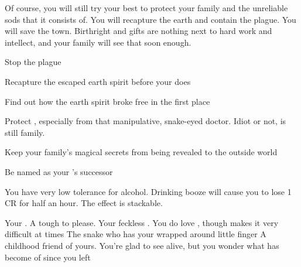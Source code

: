 \documentclass[char]{Pestilence}
\begin{document}
Of course, you will still try your best to protect your family and the unreliable sods that it consists of. You will recapture the earth and contain the plague. You will save the town. Birthright and gifts are nothing next to hard work and intellect, and your family will see that soon enough.

\begin{itemz}[Goals]
	\item Stop the plague
	\item Recapture the escaped earth spirit before your \cElder{\parent} does
	\item Find out how the earth spirit broke free in the first place
	\item Protect \cRebel{}, especially from that manipulative, snake-eyed doctor. Idiot or not, \cRebel{} is still family.
	\item Keep your family's magical secrets from being revealed to the outside world
	\item Be named as your \cElder{\parent}'s successor
\end{itemz}

\begin{itemz}[Notes]
	\item You have very low tolerance for alcohol. Drinking booze will cause you to lose 1 CR for half an hour. The effect is stackable.
\end{itemz}

\begin{contacts}
	\contact{\cElder{}} Your \cElder{\parent}. A tough \cElder{\human} to please.
	\contact{\cRebel{}} Your feckless \cRebel{\sibling}. You do love \cRebel{\them}, though \cRebel{\they} makes it very difficult at times
	\contact{\cOutsider{}} The snake who has your \cRebel{\sibling} wrapped around \cOutsider{\their} little finger 
	\contact{\cCon{}} A childhood friend of yours. You're glad to see \cCon{\them} alive, but you wonder what has become of \cCon{\them} since you left  
\end{contacts}
\end{document}
